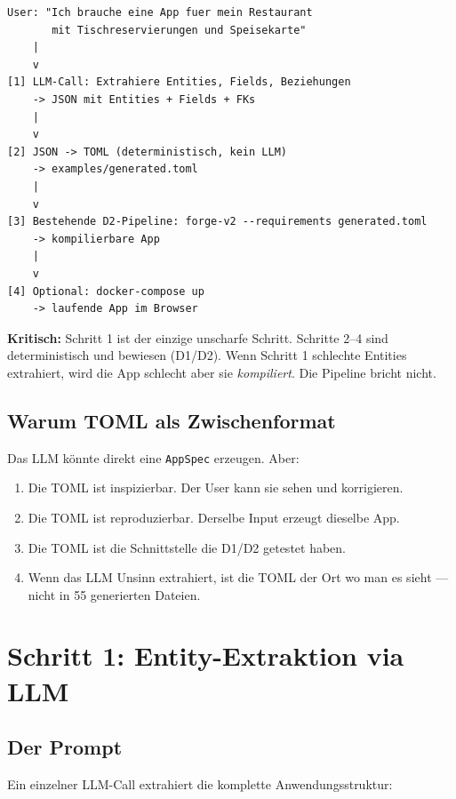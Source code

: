 \documentclass[11pt,a4paper]{article}
\begin{document}
\begin{lstlisting}[language={}]
User: "Ich brauche eine App fuer mein Restaurant
       mit Tischreservierungen und Speisekarte"
    |
    v
[1] LLM-Call: Extrahiere Entities, Fields, Beziehungen
    -> JSON mit Entities + Fields + FKs
    |
    v
[2] JSON -> TOML (deterministisch, kein LLM)
    -> examples/generated.toml
    |
    v
[3] Bestehende D2-Pipeline: forge-v2 --requirements generated.toml
    -> kompilierbare App
    |
    v
[4] Optional: docker-compose up
    -> laufende App im Browser
\end{lstlisting}

\textbf{Kritisch:} Schritt 1 ist der einzige unscharfe Schritt.
Schritte 2--4 sind deterministisch und bewiesen (D1/D2).
Wenn Schritt 1 schlechte Entities extrahiert, wird die App schlecht
aber sie \emph{kompiliert}. Die Pipeline bricht nicht.

\subsection{Warum TOML als Zwischenformat}

Das LLM k\"onnte direkt eine \texttt{AppSpec} erzeugen. Aber:

\begin{enumerate}[nosep]
\item Die TOML ist inspizierbar. Der User kann sie sehen und korrigieren.
\item Die TOML ist reproduzierbar. Derselbe Input erzeugt dieselbe App.
\item Die TOML ist die Schnittstelle die D1/D2 getestet haben.
\item Wenn das LLM Unsinn extrahiert, ist die TOML der Ort wo man
      es sieht --- nicht in 55 generierten Dateien.
\end{enumerate}

\section{Schritt 1: Entity-Extraktion via LLM}

\subsection{Der Prompt}

Ein einzelner LLM-Call extrahiert die komplette Anwendungsstruktur:
\end{document}
